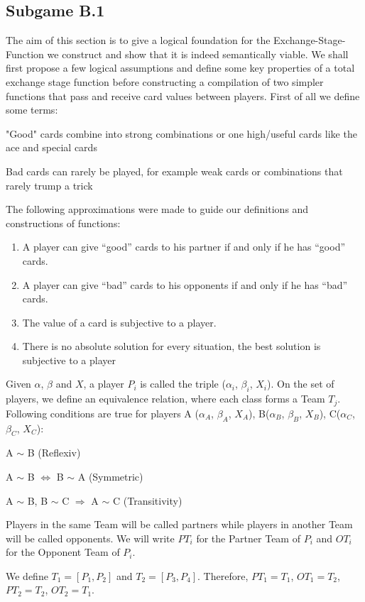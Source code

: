 \subsection{Subgame B.1}
The aim of this section is to give a logical foundation for the Exchange-Stage-Function we construct and show that it is indeed semantically viable. We shall first propose a few logical assumptions and define some key properties of a total exchange stage function before constructing a compilation of two simpler functions that pass and receive card values between players. First of all we define some terms:
\begin{definition}
"Good" cards combine into strong combinations or one high/useful cards like the ace and special cards
\end{definition}
\begin{definition}
Bad cards can rarely be played, for example weak cards or combinations that rarely trump a trick
\end{definition}
The following approximations were made to guide our definitions and constructions of functions:
\begin{enumerate}
\item A player can give “good” cards to his partner if and only if he has “good” cards.
\item A player can give “bad” cards to his opponents if and only if he has “bad” cards. 
\item The value of a card is subjective to a player. 
\item There is no absolute solution for every situation, the best solution is subjective to a player \\
\end{enumerate}
\begin{definition}
Given $\alpha$, $\beta$ and $X$, a player $P_i$ is called the triple ($\alpha_i$, $\beta_i$, $X_i$). 
On the set of players, we define an equivalence relation, where each class forms a Team $T_j$. Following conditions are true for players A ($\alpha_A$, $\beta_A$, $X_A$), B($\alpha_B$, $\beta_B$, $X_B$), C($\alpha_C$, $\beta_C$, $X_C$):
 \begin{axioms}[(P1)]
  \item A $\sim $ B (Reflexiv)
  \item A $\sim$ B $\Leftrightarrow$ B $\sim$ A (Symmetric)
  \item A $\sim$ B, B $\sim$ C $\Rightarrow$ A $\sim$ C (Transitivity)
  \end{axioms}
Players in the same Team will be called partners while players in another Team will be called opponents. We will write $PT_i$ for the Partner Team of $P_i$ and $OT_i$  for the Opponent Team of $P_i$.

We define $T_1 = [P_1,P_2]$  and $T_2 = [P_3,P_4]$. Therefore, $PT_1 = T_1$, $OT_1 = T_2$, $PT_2 = T_2$, $OT_2 = T_1$.

\end{definition}

